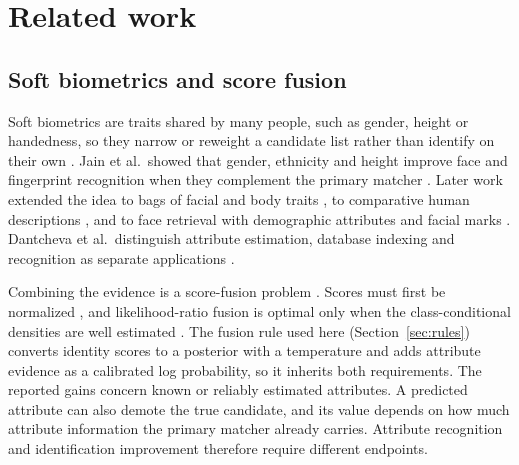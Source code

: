 \section{Related work}
\label{sec:related}
\subsection{Soft biometrics and score fusion}
Soft biometrics are traits shared by many people, such as gender, height or handedness, so they narrow or reweight a candidate list rather than identify on their own \cite{jain2004soft,dantcheva2016soft,nixon2015soft}. Jain et al.\ showed that gender, ethnicity and height improve face and fingerprint recognition when they complement the primary matcher \cite{jain2004integrating}. Later work extended the idea to bags of facial and body traits \cite{dantcheva2011bag}, to comparative human descriptions \cite{reid2014comparative}, and to face retrieval with demographic attributes and facial marks \cite{park2010soft}. Dantcheva et al.\ distinguish attribute estimation, database indexing and recognition as separate applications \cite{dantcheva2016soft}.

Combining the evidence is a score-fusion problem \cite{kittler1998combining,ross2003fusion}. Scores must first be normalized \cite{jain2005normalization}, and likelihood-ratio fusion is optimal only when the class-conditional densities are well estimated \cite{nandakumar2008likelihood}. The fusion rule used here (Section~\ref{sec:rules}) converts identity scores to a posterior with a temperature and adds attribute evidence as a calibrated log probability, so it inherits both requirements. The reported gains concern known or reliably estimated attributes. A predicted attribute can also demote the true candidate, and its value depends on how much attribute information the primary matcher already carries. Attribute recognition and identification improvement therefore require different endpoints.

